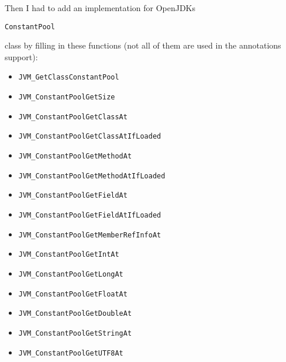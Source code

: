 \documentclass[a4paper, 10pt, titlepage]{scrartcl} %
\begin{document}
Then I had to add an implementation for OpenJDKs \begin{scriptsize}\verb|ConstantPool|\end{scriptsize} class by
filling in these functions (not all of them are used in the annotations support):
\begin{itemize}
 \item \begin{scriptsize}\verb|JVM_GetClassConstantPool|\end{scriptsize}
 \item \begin{scriptsize}\verb|JVM_ConstantPoolGetSize|\end{scriptsize}
 \item \begin{scriptsize}\verb|JVM_ConstantPoolGetClassAt|\end{scriptsize}
 \item \begin{scriptsize}\verb|JVM_ConstantPoolGetClassAtIfLoaded|\end{scriptsize}
 \item \begin{scriptsize}\verb|JVM_ConstantPoolGetMethodAt|\end{scriptsize}
 \item \begin{scriptsize}\verb|JVM_ConstantPoolGetMethodAtIfLoaded|\end{scriptsize}
 \item \begin{scriptsize}\verb|JVM_ConstantPoolGetFieldAt|\end{scriptsize}
 \item \begin{scriptsize}\verb|JVM_ConstantPoolGetFieldAtIfLoaded|\end{scriptsize}
 \item \begin{scriptsize}\verb|JVM_ConstantPoolGetMemberRefInfoAt|\end{scriptsize}
 \item \begin{scriptsize}\verb|JVM_ConstantPoolGetIntAt|\end{scriptsize}
 \item \begin{scriptsize}\verb|JVM_ConstantPoolGetLongAt|\end{scriptsize}
 \item \begin{scriptsize}\verb|JVM_ConstantPoolGetFloatAt|\end{scriptsize}
 \item \begin{scriptsize}\verb|JVM_ConstantPoolGetDoubleAt|\end{scriptsize}
 \item \begin{scriptsize}\verb|JVM_ConstantPoolGetStringAt|\end{scriptsize}
 \item \begin{scriptsize}\verb|JVM_ConstantPoolGetUTF8At|\end{scriptsize}
\end{itemize}
\end{document}
